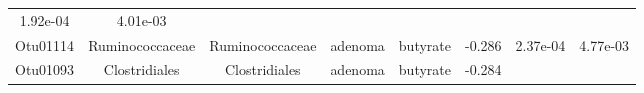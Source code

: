 \documentclass[11pt,]{article}
\begin{document}
\begin{longtable}[]{@{}cccccccc@{}}
\begin{minipage}[t]{0.08\columnwidth}
1.92e-04\strut
\end{minipage} & \begin{minipage}[t]{0.08\columnwidth}\centering\strut
4.01e-03\strut
\end{minipage}\tabularnewline
\begin{minipage}[t]{0.08\columnwidth}\centering\strut
Otu01114\strut
\end{minipage} & \begin{minipage}[t]{0.15\columnwidth}\centering\strut
Ruminococcaceae\strut
\end{minipage} & \begin{minipage}[t]{0.15\columnwidth}\centering\strut
Ruminococcaceae\strut
\end{minipage} & \begin{minipage}[t]{0.08\columnwidth}\centering\strut
adenoma\strut
\end{minipage} & \begin{minipage}[t]{0.09\columnwidth}\centering\strut
butyrate\strut
\end{minipage} & \begin{minipage}[t]{0.07\columnwidth}\centering\strut
-0.286\strut
\end{minipage} & \begin{minipage}[t]{0.08\columnwidth}\centering\strut
2.37e-04\strut
\end{minipage} & \begin{minipage}[t]{0.08\columnwidth}\centering\strut
4.77e-03\strut
\end{minipage}\tabularnewline
\begin{minipage}[t]{0.08\columnwidth}\centering\strut
Otu01093\strut
\end{minipage} & \begin{minipage}[t]{0.15\columnwidth}\centering\strut
Clostridiales\strut
\end{minipage} & \begin{minipage}[t]{0.15\columnwidth}\centering\strut
Clostridiales\strut
\end{minipage} & \begin{minipage}[t]{0.08\columnwidth}\centering\strut
adenoma\strut
\end{minipage} & \begin{minipage}[t]{0.09\columnwidth}\centering\strut
butyrate\strut
\end{minipage} & \begin{minipage}[t]{0.07\columnwidth}\centering\strut
-0.284\strut
\end{minipage} & \begin{minipage}[t]{0.08\columnwidth}\centering\strut

\end{minipage}
\end{longtable}
\end{document}

